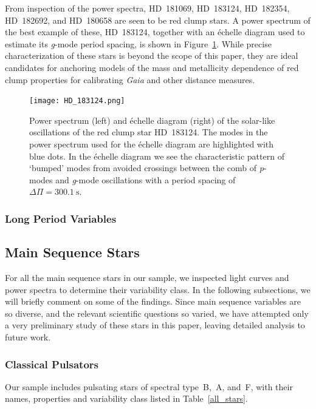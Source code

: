 \documentclass[a4paper,fleqn,usenatbib]{mnras}
\newcommand{\gaia}{\emph{Gaia}\xspace}
\begin{document}
From inspection of the power spectra, HD~181069, HD~183124, HD~182354, HD~182692, and HD~180658 are seen to be red clump stars. A power spectrum of the best example of these, HD~183124, together with an \'{e}chelle diagram used to estimate its \emph{g}-mode period spacing, is shown in Figure~\ref{HD_183124}. While precise characterization of these stars is beyond the scope of this paper, they are ideal candidates for anchoring models of the mass and metallicity dependence of red clump properties for calibrating \gaia and other distance measures. 

\begin{figure}
\noindent\texttt{[image: HD\_183124.png]}

\caption{\label{HD_183124}
Power spectrum (left) and \'{e}chelle diagram (right) of the solar-like oscillations of the red clump star HD~183124. The modes in the power spectrum used for the \'{e}chelle diagram are highlighted with blue dots. In the \'{e}chelle diagram we see the characteristic pattern of `bumped' modes from avoided crossings between the comb of \emph{p}-modes and \emph{g}-mode oscillations with a period spacing of $\Delta \Pi = 300.1~\text{s}$.}
\end{figure}

\subsubsection{Long Period Variables}
\label{lpvs}

\subsection{Main Sequence Stars}
\label{mainseq}

For all the main sequence stars in our sample, we inspected light curves and power spectra to determine their variability class. In the following subsections, we will briefly comment on some of the findings. Since main sequence variables are so diverse, and the relevant scientific questions so varied, we have attempted only a very preliminary study of these stars in this paper, leaving detailed analysis to future work.

\subsubsection{Classical Pulsators}
\label{pulsators}

Our sample includes pulsating stars of spectral type~B,~A, and~F, with their names, properties and variability class listed in Table~\ref{all_stars}. 
\end{document}
